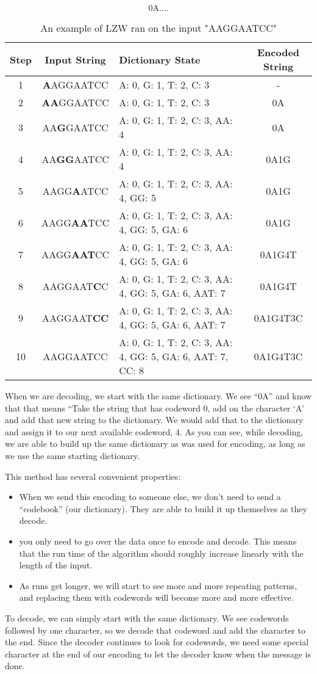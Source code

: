 \documentclass[12pt,twoside]{reedthesis}
\providecommand{\tightlist}{%
  \setlength{\itemsep}{0pt}\setlength{\parskip}{0pt}}
\begin{document}
\[\text{0A....}\]
\begin{table}
\begin{tabular}{ | c | c | p{} | c | }
\hline
\textbf{Step} & \textbf{Input String} & \textbf{Dictionary State} & \textbf{Encoded String} \\
\hline
1 & \textbf{A}AGGAATCC & {A: 0, G: 1, T: 2, C: 3} & - \\
\hline
2 & \textbf{AA}GGAATCC & {A: 0, G: 1, T: 2, C: 3} & 0A \\
\hline
3 & AA\textbf{G}GAATCC & {A: 0, G: 1, T: 2, C: 3, AA: 4} & 0A  \\
\hline
4 & AA\textbf{GG}AATCC & {A: 0, G: 1, T: 2, C: 3, AA: 4} & 0A1G   \\
\hline
5 & AAGG\textbf{A}ATCC & {A: 0, G: 1, T: 2, C: 3, AA: 4, GG: 5} & 0A1G \\
\hline
6 & AAGG\textbf{AA}TCC & {A: 0, G: 1, T: 2, C: 3, AA: 4, GG: 5, GA: 6} & 0A1G  \\
\hline
7 & AAGG\textbf{AAT}CC & {A: 0, G: 1, T: 2, C: 3, AA: 4, GG: 5, GA: 6} & 0A1G4T  \\
\hline
8 & AAGGAAT\textbf{C}C & {A: 0, G: 1, T: 2, C: 3, AA: 4, GG: 5, GA: 6, AAT: 7} & 0A1G4T \\
\hline
9 & AAGGAAT\textbf{CC} & {A: 0, G: 1, T: 2, C: 3, AA: 4, GG: 5, GA: 6, AAT: 7} & 0A1G4T3C \\
\hline
10 & AAGGAATCC & {A: 0, G: 1, T: 2, C: 3, AA: 4, GG: 5, GA: 6, AAT: 7, CC: 8} & 0A1G4T3C \\
\hline
\end{tabular}
\caption{ An example of LZW ran on the input "AAGGAATCC"}
\end{table}
When we are decoding, we start with the same dictionary. We see ``0A'' and know that that means ``Take the string that has codeword 0, add on the character `A' and add that new string to the dictionary. We would add that to the dictionary and assign it to our next available codeword, 4. As you can see, while decoding, we are able to build up the same dictionary as was used for encoding, as long as we use the same starting dictionary.

This method has several convenient properties:
\begin{itemize}
\tightlist
\item
  When we send this encoding to someone else, we don't need to send a ``codebook'' (our dictionary). They are able to build it up themselves as they decode.
\item
  you only need to go over the data once to encode and decode. This means that the run time of the algorithm should roughly increase linearly with the length of the input.
\item
  As runs get longer, we will start to see more and more repeating patterns, and replacing them with codewords will become more and more effective.
\end{itemize}
To decode, we can simply start with the same dictionary. We see codewords followed by one character, so we decode that codeword and add the character to the end. Since the decoder continues to look for codewords, we need some special character at the end of our encoding to let the decoder know when the message is done.
\end{document}
